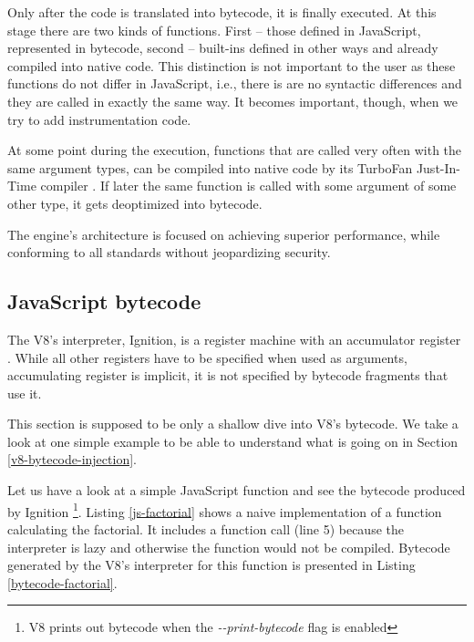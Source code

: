 Only after the code is translated into bytecode, it is finally executed. At this stage there are two
kinds of functions. First -- those defined in JavaScript, represented in bytecode, second -- built-ins
defined in other ways and already compiled into native code. This distinction is not important 
to the user as these functions do not differ in JavaScript, i.e., there is are no syntactic differences
and they are called in exactly the same way.
It becomes important, though, when we try to add instrumentation code.

At some point during the execution, functions that are called very often with the same argument types, 
can be compiled into native code by its TurboFan Just-In-Time compiler \cite{v8:turbofan-jit}.
If later the same function is called with some argument of some other type, it gets deoptimized into bytecode.

The engine's architecture is focused on achieving superior performance, while conforming to all
standards without jeopardizing security. 


\subsection{JavaScript bytecode}
\label{v8-bytecode}
The V8's interpreter, Ignition, is a register machine with an accumulator register \cite{medium:js-bytecode}.
While all other registers have to be specified when used as arguments, accumulating register
is implicit, it is not specified by bytecode fragments that use it.

This section is supposed to be only a shallow dive into V8's bytecode. We take a look at one simple example
to be able to understand what is going on in Section \ref{v8-bytecode-injection}.

Let us have a look at a simple JavaScript function and see the bytecode produced by Ignition
\footnote{V8 prints out bytecode when the \emph{-{}-print-bytecode} flag is enabled}.
Listing \ref{js-factorial} shows a naive implementation of a function calculating the factorial.
It includes a function call (line 5) because the interpreter is lazy and otherwise the function would not be compiled.
Bytecode generated by the V8's interpreter for this function is presented in Listing \ref{bytecode-factorial}.




